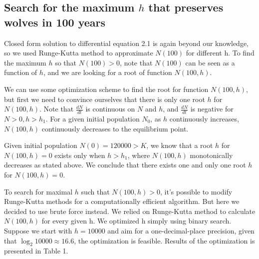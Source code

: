 \documentclass{amsart}
\theoremstyle{definition}
\theoremstyle{remark}
\numberwithin{equation}{section}
\begin{document}
\subsection{Search for the maximum $h$ that preserves wolves in 100 years} 

Closed form solution to differential equation 2.1 is again beyond our knowledge, so we used Runge-Kutta method to approximate $N(100)$ for different h. To find the maximum $h$ so that $N(100)>0$, note that $N(100)$ can be seen as a function of $h$, and we are looking for a root of function $N(100,h)$.

We can use some optimization scheme to find the root for function $N(100,h)$, but first we need to convince ourselves that there is only one root $h$ for $N(100,h)$. Note that $\frac{dN}{dt}$ is continuous on $N$ and $h$, and $\frac{dN}{dt}$ is negative for $N>0, h>h_1$. For a given initial population $N_0$, as $h$ continuously increases, $N(100,h)$ continuously decreases to the equilibrium point.

Given initial population $N(0)=120000>K$, we know that a root $h$ for $N(100,h)=0$ exists only when $h>h_1$, where $N(100,h)$ monotonically decreases as stated above. We conclude that there exists one and only one root $h$ for $N(100,h)=0$.

To search for maximal $h$ such that $N(100,h)>0$, it's possible to modify Runge-Kutta methods for a computationally efficient algorithm. But here we decided to use brute force instead. We relied on Runge-Kutta method to calculate $N(100,h)$ for every given h. We optimized h simply using binary search. Suppose we start with $h=10000$ and aim for a one-decimal-place precision, given that $\log_2 10000\approx16.6$, the optimization is feasible. Results of the optimization is presented in Table 1.
\end{document}
